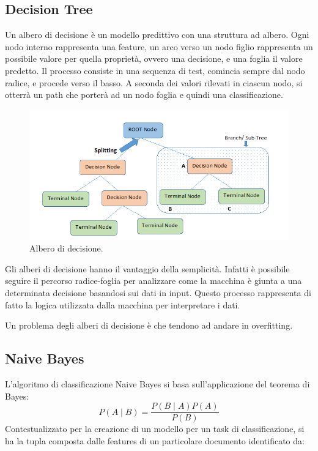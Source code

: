 \documentclass[oneside]{book}
\begin{document}
\subsection{Decision Tree}
Un albero di decisione è un modello predittivo con una struttura ad albero. Ogni nodo interno rappresenta una feature, un arco verso un nodo figlio rappresenta un possibile valore per quella proprietà, ovvero una decisione, e una foglia il valore predetto. Il processo consiste in una sequenza di test, comincia sempre dal nodo radice, e procede verso il basso. A seconda dei valori rilevati in ciascun nodo, si otterrà un path che porterà ad un nodo foglia e quindi una classificazione.

\begin{figure}[!h]
	\centering
	\includegraphics[width=13cm]{assets/decision_tree.png}
	\caption[Caption for LOF]{Albero di decisione.\footnotemark}
	\label{fig:decision-tree}
\end{figure}




Gli alberi di decisione hanno il vantaggio della semplicità. Infatti è possibile seguire il percorso radice-foglia per analizzare come la macchina è giunta a una determinata decisione basandosi sui dati in input. Questo processo rappresenta di fatto la logica utilizzata dalla macchina per interpretare i dati.

Un problema degli alberi di decisione è che tendono ad andare in overfitting.

\newpage
\subsection{Naive Bayes}
L'algoritmo di classificazione Naive Bayes si basa sull'applicazione del teorema di Bayes:
$$P(A \mid B) = \frac{P(B \mid A)P(A)}{P(B)}$$
Contestualizzato per la creazione di un modello per un task di classificazione, si ha la tupla composta dalle features di un particolare documento identificato da:
\end{document}
